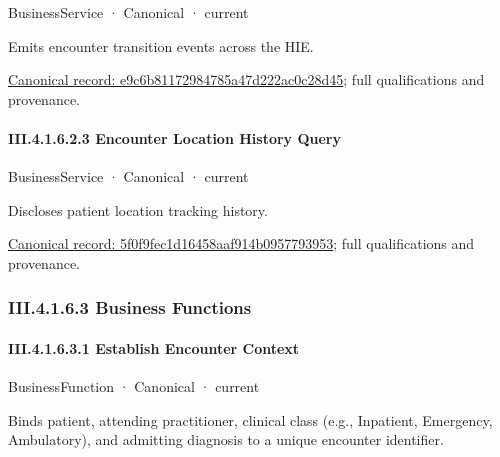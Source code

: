 \label{element:e9c6b81172984785a47d222ac0c28d45}
{\small BusinessService · Canonical · current}\par

Emits encounter transition events across the HIE.


{\footnotesize \href{../../../../../../../continuum/business/business-service/e9c6b81172984785a47d222ac0c28d45.md}{Canonical record: e9c6b81172984785a47d222ac0c28d45}; full qualifications and provenance.}\par
\paragraph*{III.4.1.6.2.3 Encounter Location History Query}
\label{navigation:III.4.1.6.2.3}

\label{element:5f0f9fec1d16458aaf914b0957793953}
{\small BusinessService · Canonical · current}\par

Discloses patient location tracking history.


{\footnotesize \href{../../../../../../../continuum/business/business-service/5f0f9fec1d16458aaf914b0957793953.md}{Canonical record: 5f0f9fec1d16458aaf914b0957793953}; full qualifications and provenance.}\par
\subsubsection*{III.4.1.6.3 Business Functions}
\label{navigation:III.4.1.6.3}

\paragraph*{III.4.1.6.3.1 Establish Encounter Context}
\label{navigation:III.4.1.6.3.1}

\label{element:df00c187d509483a8408304a066abec4}
{\small BusinessFunction · Canonical · current}\par

Binds patient, attending practitioner, clinical class (e.g., Inpatient, Emergency, Ambulatory), and admitting diagnosis to a unique encounter identifier.


